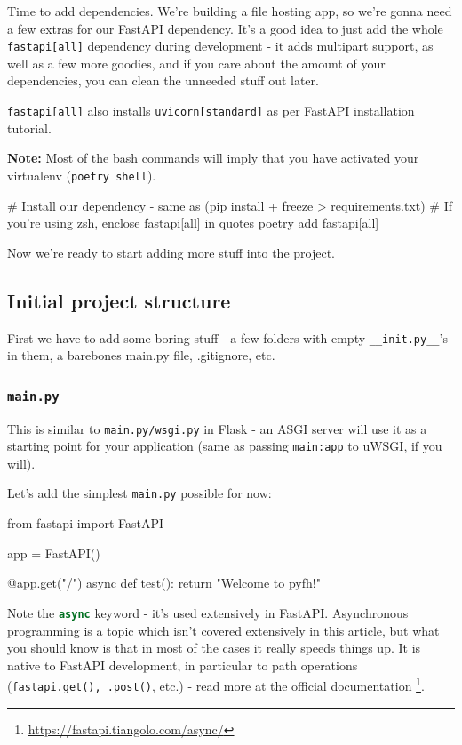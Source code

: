 \documentclass{article}
\newcommand{\flink}[1]{\footnote{\href{#1}{#1}}}
\newcommand{\note}{\textbf{\color{red}Note: }}
\newcommand{\pyinline}[1]{\lstinline[language=Python, style=cstyle, morekeywords={async}, basicstyle=\ttfamily\normalsize]{#1}}
\newcommand{\bashinline}[1]{\lstinline[language=bash, style=cstyle, morekeywords={docker, poetry, git, mv, python, uvicorn}, basicstyle=\ttfamily\normalsize]{#1}}
\begin{document}
Time to add dependencies. We're building a file hosting app, so we're gonna need a few extras for our FastAPI dependency. It's a good idea to just add the whole \texttt{fastapi[all]} dependency during development - it adds multipart support, as well as a few more goodies, and if you care about the amount of your dependencies, you can clean the unneeded stuff out later.

\texttt{fastapi[all]} also installs \texttt{uvicorn[standard]} as per FastAPI installation tutorial.

\note Most of the bash commands will imply that you have activated your virtualenv (\bashinline{poetry shell}).

\begin{bashcode}
# Install our dependency - same as (pip install + freeze > requirements.txt)
# If you're using zsh, enclose fastapi[all] in quotes
poetry add fastapi[all]
\end{bashcode}

Now we're ready to start adding more stuff into the project.

\subsection{Initial project structure}

First we have to add some boring stuff - a few folders with empty \texttt{\_\_init.py\_\_}'s in them, a barebones main.py file, .gitignore, etc.

\subsubsection{\texttt{main.py}}

This is similar to \texttt{main.py/wsgi.py} in Flask - an ASGI server will use it as a starting point for your application (same as passing \texttt{main:app} to uWSGI, if you will).

Let's add the simplest \texttt{main.py} possible for now:

\begin{pycode}
from fastapi import FastAPI

app = FastAPI()

@app.get("/")
async def test():
    return "Welcome to pyfh!"
\end{pycode}

Note the \pyinline{async} keyword - it's used extensively in FastAPI. Asynchronous programming is a topic which isn't covered extensively in this article, but what you should know is that in most of the cases it really speeds things up. It is native to FastAPI development, in particular to path operations (\pyinline{fastapi.get(), .post()}, etc.) - read more at the official documentation \flink{https://fastapi.tiangolo.com/async/}.
\end{document}
